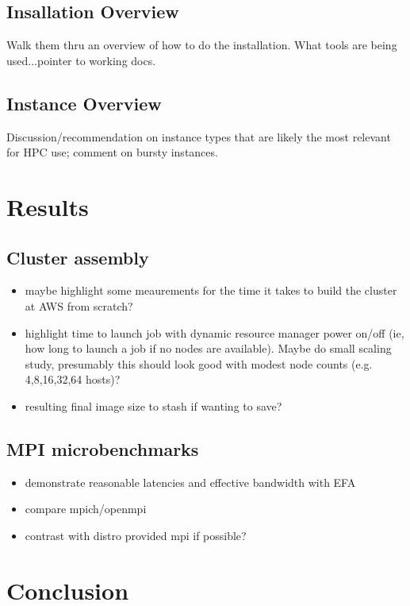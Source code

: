 \documentclass[sigconf,screen]{acmart}
\begin{document}
\subsection{Insallation Overview}
Walk them thru an overview of how to do the installation. What tools are being
used...pointer to working docs.

\subsection{Instance Overview}

Discussion/recommendation on instance types that are likely the most relevant
for HPC use; comment on bursty instances.

\lipsum[4]

\section{Results}
\lipsum[6]
\subsection{Cluster assembly}
\begin{itemize}
\item maybe highlight some meaurements for the time it takes to build the
  cluster at AWS from scratch?
\item highlight time to launch job with dynamic resource manager power on/off
  (ie, how long to launch a job if no nodes are available). Maybe do small
  scaling study, presumably this should look good with modest node counts
  (e.g. 4,8,16,32,64 hosts)?
\item resulting final image size to stash if wanting to save?
\end{itemize}

\subsection{MPI microbenchmarks}
\begin {itemize}
\item demonstrate reasonable latencies and effective bandwidth with EFA
\item compare mpich/openmpi
\item contrast with distro provided mpi if possible?
\end{itemize}

\section{Conclusion}
\lipsum[8]
\end{document}
